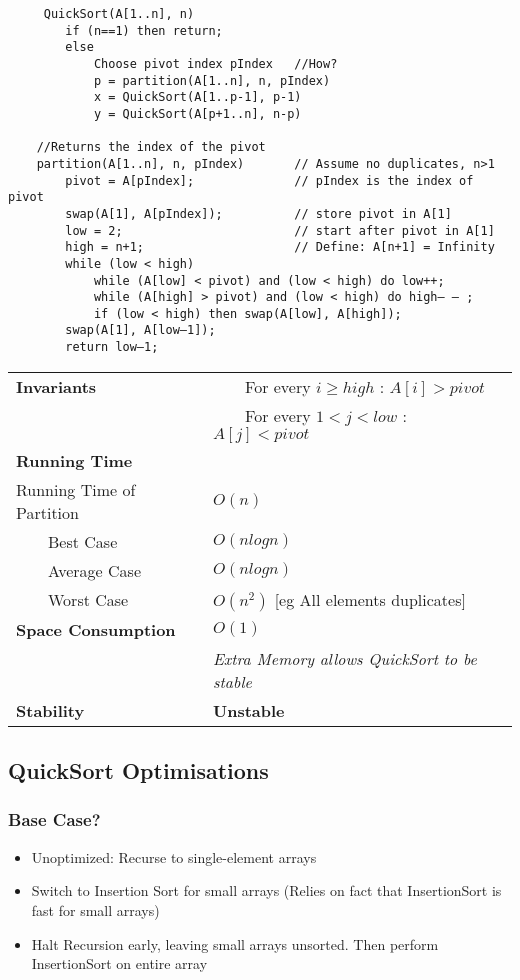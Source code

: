 \documentclass{article}
\newcommand{\tabitem}{~~\llap{\textbullet}~~}
\begin{document}
    \begin{verbatim}
     QuickSort(A[1..n], n)
        if (n==1) then return;
        else
            Choose pivot index pIndex   //How?
            p = partition(A[1..n], n, pIndex)
            x = QuickSort(A[1..p-1], p-1)
            y = QuickSort(A[p+1..n], n-p)

    //Returns the index of the pivot
    partition(A[1..n], n, pIndex)       // Assume no duplicates, n>1
        pivot = A[pIndex];              // pIndex is the index of pivot
        swap(A[1], A[pIndex]);          // store pivot in A[1]
        low = 2;                        // start after pivot in A[1]
        high = n+1;                     // Define: A[n+1] = Infinity
        while (low < high)
            while (A[low] < pivot) and (low < high) do low++;
            while (A[high] > pivot) and (low < high) do high– – ;
            if (low < high) then swap(A[low], A[high]);
        swap(A[1], A[low–1]);
        return low–1;
    \end{verbatim}
    
    \begin{tabular}{ll}
        \toprule
        \textbf{Invariants} & \tabitem For every $i \geq high$ : $A[i] > pivot$\\
        & \tabitem For every $1 < j < low$ : $A[j] < pivot$\\
        \textbf{Running Time} & \\
        Running Time of Partition & $O(n)$\\
        \tabitem Best Case & $O(nlogn)$\\
        \tabitem Average Case & $O(nlogn)$\\
        \tabitem Worst Case & $O(n^{2})$ [eg All elements duplicates]\\
        \midrule
        \textbf{Space Consumption} & $O(1)$\\
        & \emph{Extra Memory allows QuickSort to be stable}\\
        \midrule
        \textbf{Stability} & \textbf{Unstable}\\
        \bottomrule
    \end{tabular}


    

    \subsection{QuickSort Optimisations}

    \subsubsection{Base Case?}
    \begin{itemize}
        \item Unoptimized: Recurse to single-element arrays
        \item Switch to Insertion Sort for small arrays (Relies on fact that InsertionSort is fast for small arrays)
        \item Halt Recursion early, leaving small arrays unsorted. Then perform InsertionSort on entire array
    \end{itemize}
    
\end{document}
